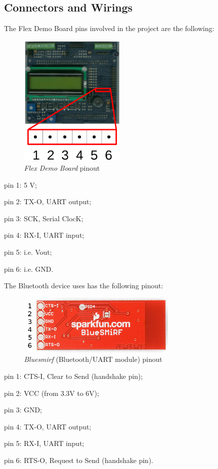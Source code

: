 \documentclass[twoside]{article}
\begin{document}
\begin{multicols}{2}
\subsection{Connectors and Wirings}

The Flex Demo Board pins involved in the project are the following:

\begin{figure}[H]
  \centering
  \includegraphics[width=2in]{img/flex_demo_board_pinout}
  \caption{\textit{Flex Demo Board} pinout}
\end{figure}

\begin{compactitem}
\item pin 1: 5 V;
\item pin 2: TX-O, UART output;
\item pin 3: SCK, Serial ClocK;
\item pin 4: RX-I, UART input;
\item pin 5: i.e. Vout;
\item pin 6: i.e. GND.
\end{compactitem}

The Bluetooth device uses has the following pinout:

\begin{figure}[H]
  \centering
  \includegraphics[width=3in]{img/bluesmirf_pinout}
  \caption{\textit{Bluesmirf} (Bluetooth/UART module) pinout}
\end{figure}

\begin{compactitem}
\item pin 1: CTS-I, Clear to Send (handshake pin);
\item pin 2: VCC (from 3.3V to 6V);
\item pin 3: GND;
\item pin 4: TX-O, UART output;
\item pin 5: RX-I, UART input;
\item pin 6: RTS-O, Request to Send (handshake pin).
\end{compactitem}


\end{multicols}
\end{document}
